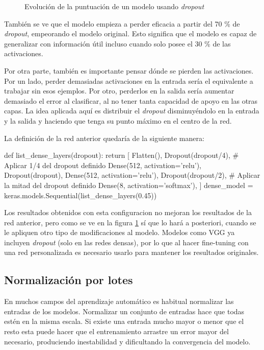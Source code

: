 \begin{figure}
    \caption{Evolución de la puntuación de un modelo usando \textit{dropout}}
\label{dropout}
\end{figure}


También se ve que el modelo empieza a perder eficacia a partir del 70 \% de \textit{dropout}, empeorando el modelo original. Esto significa que el modelo es capaz de generalizar con información útil incluso cuando solo posee el 30 \% de las activaciones.

Por otra parte, también es importante pensar dónde se pierden las activaciones. Por un lado, perder demasiadas activaciones en la entrada sería el equivalente a trabajar sin esos ejemplos. Por otro, perderlos en la salida sería aumentar demasiado el error al clasificar, al no tener tanta capacidad de apoyo en las otras capas.  La idea aplicada aquí es distribuir el \textit{dropout} disminuyéndolo en la entrada y la salida y haciendo que tenga su punto máximo en el centro de la red.

La definición de la red anterior quedaría de la siguiente manera:

\begin{python}
def list_dense_layers(dropout):
    return [
        Flatten(),
        Dropout(dropout/4),  # Aplicar 1/4 del dropout definido 
        Dense(512, activation='relu'),
        Dropout(dropout),
        Dense(512, activation='relu'),
        Dropout(dropout/2),  # Aplicar la mitad del dropout definido
        Dense(8, activation='softmax'),
    ]
dense_model = keras.models.Sequential(list_dense_layers(0.45))
\end{python}

Los resultados obtenidos con esta configuracion no mejoran los resultados de la red anterior, pero como se ve en la figura \ref{dropout} sí que lo hará a posteriori, cuando se le apliquen otro tipo de modificaciones al modelo. Modelos como VGG ya incluyen \textit{dropout} (solo en las redes densas), por lo que al hacer fine-tuning con una red personalizada es necesario usarlo para mantener los resultados originales.

\subsection{Normalización por lotes}

En muchos campos del aprendizaje automático es habitual normalizar las entradas de los modelos. Normalizar un conjunto de entradas hace que todas estén en la misma escala. Si existe una entrada mucho mayor o menor que el resto esta puede hacer que el entrenamiento arrastre un error mayor del necesario, produciendo inestabilidad y dificultando la convergencia del modelo.

